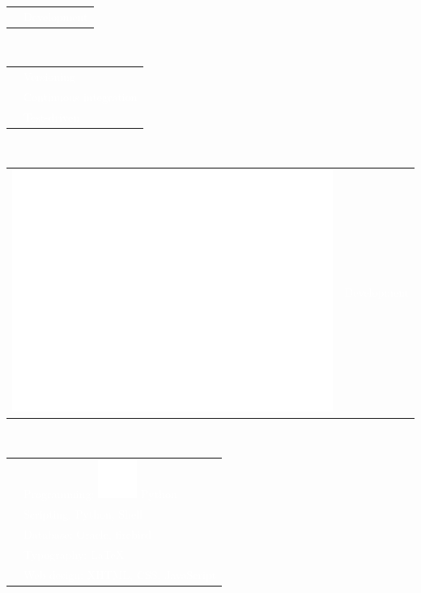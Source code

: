 \documentclass[letterpaper]{article}
\begin{document}
\begin{minipage}[t]{1.\linewidth}
\begin{minipage}{0.47\linewidth}
{\begin{minipage}{1\linewidth}
\begin{minipage}{1\linewidth}
\begin{minipage}[t]{0.47\linewidth}
\begin{minipage}{1\linewidth}
\begin{tabularx}{1\textwidth}{rX}
					& \large\textmd{\textcolor{white}{Development}}\\
				\end{tabularx}\\
			\end{minipage}
			\begin{minipage}{1\linewidth}
				\vspace{1ex}
				{\small
				\begin{tabularx}{1\textwidth}{rX}
					& \textcolor{white}{Versioning}\\
				 	& \textcolor{white}{Continuous integration}\\
				 	& \textcolor{white}{Test-driven}\\				 	
				\end{tabularx}\\
				}
			\end{minipage}
		\end{minipage}		
		\hfill
		\begin{minipage}[t]{0.47\linewidth}
			\begin{tabularx}{1\textwidth}{rX}
				\includegraphics[width=0.1\linewidth]{code.eps} & 
				\large\textmd{\textcolor{white}{Development}}\\
			\end{tabularx}\\
			\vspace{1ex}
			\textcolor{white}{\small
			\begin{tabularx}{1\textwidth}{rX}
				 & \textmd{Programming:} \includegraphics[trim=0.18cm 0.18cm 
				 0.18cm 
				 0.18cm, clip=true, width=0.08\linewidth]{python-48.png} 
				 {\scriptsize Python}\\
				& \textmd{Scripting:} {\scriptsize Python, Shell}\\
				& \textmd{Database:} {\scriptsize Oracle, firebird}\\
				& \textmd{Typography:} {\scriptsize \LaTeX}\\
				& \textmd{Web design:} {\scriptsize XHTML, CSS, JavaScript}\\
			\end{tabularx}
			}
		\end{minipage}\\ 

\end{minipage}
\end{minipage}}
\end{minipage}
\end{minipage}
\end{document}
